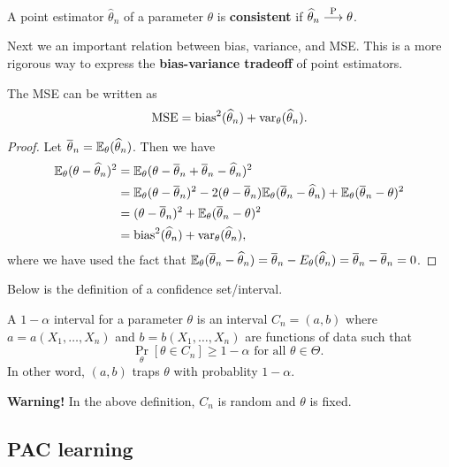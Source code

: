 \documentclass[a4paper]{article}
\begin{document}
\begin{defi}
  A point estimator $\hat\theta_n$ of a parameter
  $\theta$ is \textbf{consistent} if $\widehat{\theta}_n
  \overset{\mathrm{P}}{\longrightarrow} \theta$.
\end{defi}

Next we an important relation between bias, variance,
and MSE. This is a more rigorous way to express the
\textbf{bias-variance tradeoff} of point estimators.

\begin{thm}
The MSE can be written as
\[
\operatorname{MSE} = \operatorname{bias}^2 (\widehat{\theta}_n) + \operatorname{var}_\theta (\widehat{\theta}_n).
\]
\end{thm}

\begin{proof}
  Let $\overline{\theta}_n = \mathbb{E}_\theta (\widehat{\theta}_n)$.
  Then we have
  \[
  \begin{aligned}
    \mathbb{E}_\theta(\theta - \widehat{\theta}_n)^2
    &= \mathbb{E}_\theta(\theta - \overline{\theta}_n + \overline{\theta}_n
    - \widehat{\theta}_n)^2 \\
    &= \mathbb{E}_\theta(\theta - \overline{\theta}_n)^2
    - 2 (\theta - \overline{\theta}_n) \mathbb{E}_\theta (\overline{\theta}_n -
    \widehat{\theta}_n)
    + \mathbb{E}_\theta (\overline{\theta}_n - \theta)^2 \\
    &= (\theta - \overline{\theta}_n)^2
    + \mathbb{E}_\theta (\overline{\theta}_n - \theta)^2 \\
    &= \operatorname{bias}^2(\widehat{\theta}_n) + \operatorname{var}_\theta (\widehat{\theta}_n),
  \end{aligned}
  \]
  where we have used the fact that
  $\mathbb{E}_\theta (\overline{\theta}_n -
  \widehat{\theta}_n) = \overline{\theta}_n - E_\theta(\widehat{\theta}_n)
  = \overline{\theta}_n - \overline{\theta}_n = 0$.
\end{proof}

Below is the definition of a confidence set/interval.

\begin{defi}
  A $1 - \alpha$ interval for a parameter $\theta$ is
  an interval $C_n = (a, b)$ where
  $a = a(X_1, \dots, X_n)$ and $b = b(X_1, \dots, X_n)$
  are functions of data such that
  \[
  \Pr_\theta[\theta \in C_n] \geq 1 - \alpha
  \text{ for all $\theta \in \Theta$. }
  \]
  In other word, $(a, b)$ traps $\theta$ with probablity
  $1 - \alpha$.
\end{defi}

\textbf{Warning!} In the above definition,
$C_n$ is random and $\theta$ is fixed.

\subsection{PAC learning}
\end{document}
